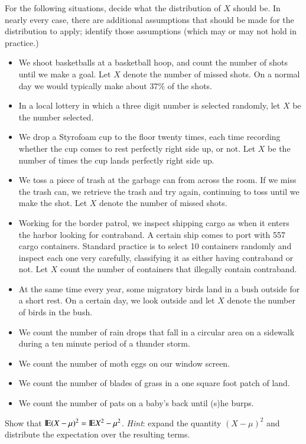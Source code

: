 \documentclass[captions=tableheading]{scrbook}
\begin{document}
\begin{xca}
For the following situations, decide what the distribution of \(X\) should be. In nearly every case, there are additional assumptions that should be made for the distribution to apply; identify those assumptions (which may or may not hold in practice.)
\begin{itemize}
\item We shoot basketballs at a basketball hoop, and count the number of shots until we make a goal. Let \(X\) denote the number of missed shots. On a normal day we would typically make about 37\% of the shots.
\item In a local lottery in which a three digit number is selected randomly, let \(X\) be the number selected.
\item We drop a Styrofoam cup to the floor twenty times, each time recording whether the cup comes to rest perfectly right side up, or not. Let \(X\) be the number of times the cup lands perfectly right side up.
\item We toss a piece of trash at the garbage can from across the room. If we miss the trash can, we retrieve the trash and try again, continuing to toss until we make the shot. Let \(X\) denote the number of missed shots.
\item Working for the border patrol, we inspect shipping cargo as when it enters the harbor looking for contraband. A certain ship comes to port with 557 cargo containers. Standard practice is to select 10 containers randomly and inspect each one very carefully, classifying it as either having contraband or not. Let \(X\) count the number of containers that illegally contain contraband.
\item At the same time every year, some migratory birds land in a bush outside for a short rest. On a certain day, we look outside and let \(X\) denote the number of birds in the bush.
\item We count the number of rain drops that fall in a circular area on a sidewalk during a ten minute period of a thunder storm.
\item We count the number of moth eggs on our window screen.
\item We count the number of blades of grass in a one square foot patch of land.
\item We count the number of pats on a baby's back until (s)he burps.
\end{itemize}
\end{xca}

\begin{xca}
\label{xca:variance-shortcut}
Show that \(\mathrm{I\hspace{-1.5pt}E}(X-\mu)^{2}=\mathrm{I\hspace{-1.5pt}E} X^{2}-\mu^{2}\). \emph{Hint}: expand the quantity \((X-\mu)^{2}\) and distribute the expectation over the resulting terms.
\end{xca}
\end{document}
